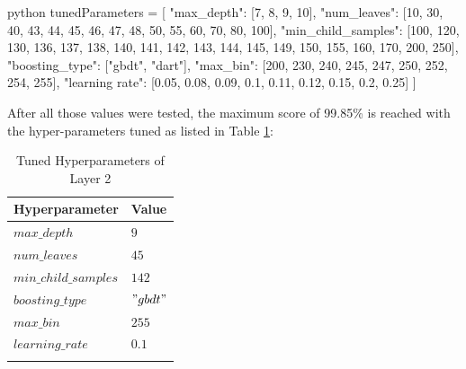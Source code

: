 
\begin{mintedbox}{python}
tunedParameters = [
    {"max_depth": [7, 8, 9, 10],
     "num_leaves": [10, 30, 40, 43, 44, 45, 46, 47, 48, 50, 55, 60, 70, 80, 100],
     "min_child_samples": [100, 120, 130, 136, 137, 138, 140, 141, 142, 143, 144, 145, 149, 150, 155, 160, 170, 200, 250],
     "boosting_type": ["gbdt", "dart"],
     "max_bin": [200, 230, 240, 245, 247, 250, 252, 254, 255],
     "learning rate": [0.05, 0.08, 0.09, 0.1, 0.11, 0.12, 0.15, 0.2, 0.25]
     }
]
\end{mintedbox}

After all those values were tested, the maximum score of 99.85\% is reached with the hyper-parameters tuned as listed in Table \ref{tab:hyp_l2}:

\begin{center}
\begin{longtable}{ |l|l| }
\hline
Hyperparameter & Value \\
\hline
$max\_depth$ & $9$ \\
\hline
$num\_leaves$ & $45$ \\
\hline
$min\_child\_samples$ & $142$ \\
\hline
$boosting\_type$ & $"gbdt"$ \\
\hline
$max\_bin$ & $255$ \\
\hline
$learning\_rate$ & $0.1$ \\
\hline
\caption{Tuned Hyperparameters of Layer 2}
\label{tab:hyp_l2}
\end{longtable}
\end{center}
